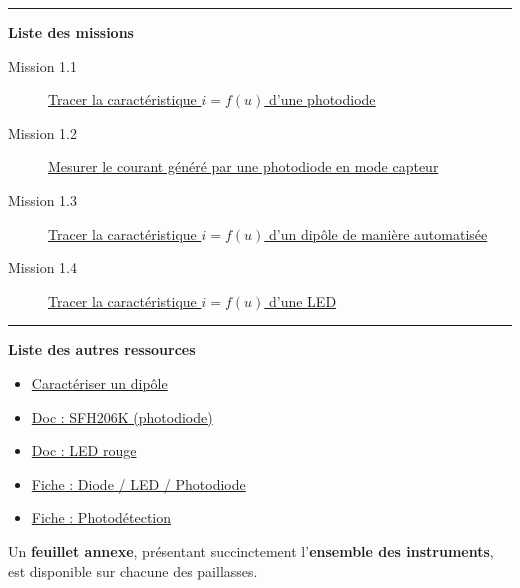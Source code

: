 \documentclass[a4paper,11pt,titlepage]{article} %
\begin{document}
\noindent \rule{\linewidth}{1pt}

\medskip

\textbf{\large Liste des missions}

\begin{description}
	\item[Mission 1.1] \hyperref[mission11]{Tracer la caractéristique $i=f(u)$ d'une photodiode}
	\item[Mission 1.2] \hyperref[mission12]{Mesurer le courant généré par une photodiode en mode capteur}
	\item[Mission 1.3] \hyperref[mission13]{Tracer la caractéristique $i = f(u)$ d'un dipôle de manière automatisée}
	\item[Mission 1.4] \hyperref[mission14]{Tracer la caractéristique $i = f(u)$ d'une LED}
\end{description}

\noindent \rule{\linewidth}{1pt}

\medskip

\textbf{\large Liste des autres ressources}
\begin{itemize}
	\item \hyperref[ressource:CaracStat]{Caractériser un dipôle}
	\item \hyperref[doc:phdSFH206K]{Doc : SFH206K (photodiode)}
	\item \hyperref[doc:ledRouge]{Doc : LED rouge}
	\item \hyperref[fiche:Led]{Fiche : Diode / LED / Photodiode}
	\item \hyperref[fiche:Photodetect]{Fiche : Photodétection}
\end{itemize}

\medskip

Un \textbf{feuillet annexe}, présentant succinctement l'\textbf{ensemble des instruments}, est disponible sur chacune des paillasses.


\newpage
\strut %





\end{document}
